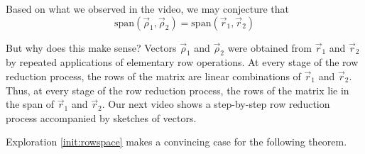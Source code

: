 \documentclass{ximera}
\begin{document}
\begin{exploration}

Based on what we observed in the video, we may conjecture that 
$$\mbox{span}(\vec{\rho}_1, \vec{\rho}_2)=\mbox{span}(\vec{r}_1, \vec{r}_2)$$

\begin{center}
\end{center}
But why does this make sense?  Vectors $\vec{\rho}_1$ and $\vec{\rho}_2$ were obtained from $\vec{r}_1$ and $\vec{r}_2$ by repeated applications of elementary row operations.  At every stage of the row reduction process, the rows of the matrix are linear combinations of $\vec{r}_1$ and $\vec{r}_2$.  Thus, at every stage of the row reduction process, the rows of the matrix lie in the span of $\vec{r}_1$ and $\vec{r}_2$.  Our next video shows a step-by-step row reduction process accompanied by sketches of vectors.


\end{exploration}

Exploration \ref{init:rowspace} makes a convincing case for the following theorem.
\end{document}

